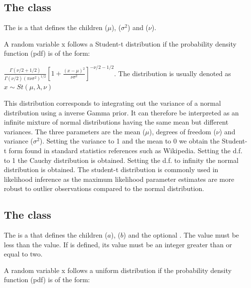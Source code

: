 \subsection{The  class}
\label{StudentTDistribution-class}
\label{studenttdistribution-class}

The \StudentTDistribution is a \ContinuousUnivariateDistribution that defines the \UncertValue children   ($\mu$),  ($\sigma^2$) and  ($\nu$).

A random variable x follows a Student-t distribution if the probability density function (pdf) is of the form:

\begin{center}
$\frac{\Gamma(\nu/2+1/2)}{\Gamma(\nu/2)(\pi\nu\sigma^2)^{1/2}}[1+\frac{(x-\mu)^2}{\nu\sigma^2}]^{-\nu/2-1/2}$. The distribution is usually denoted as $x\sim St(\mu,\lambda,\nu)$
\end{center}

This distribution corresponds to integrating out the variance of a normal distribution using a inverse Gamma prior. It can therefore be interpreted as an infinite mixture of normal distributions having the same mean but different variances. The three parameters are the mean ($\mu$), degrees of freedom ($\nu$) and variance ($\sigma^2$). Setting the variance to 1 and the mean to 0 we obtain the Student-t form found in standard statistics references such as Wikipedia. Setting the d.f. to 1 the Cauchy distribution is obtained. Setting the d.f. to infinity the normal distribution is obtained. The student-t distribution is commonly used in likelihood inference as the maximum likelihood parameter estimates are more robust to outlier observations compared to the normal distribution.

\subsection{The  class}
\label{UniformDistribution-class}
\label{uniformdistribution-class}

The \UniformDistribution is a \ContinuousUnivariateDistribution that defines the \UncertValue children  ($a$),  ($b$) and the optional .  The  value must be less than the  value.  If  is defined, its value must be an integer greater than or equal to two.

A random variable x follows a uniform distribution if the probability density function (pdf) is of the form:


